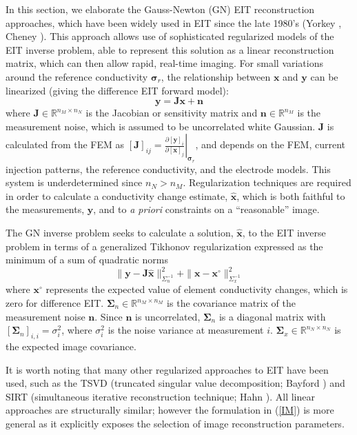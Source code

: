 \documentclass[12pt]{iopart}
\newcommand{\xB}{\mbox{$\mathbf{x}$}}
\newcommand{\xH}{\mbox{$\mathbf{\hat x}$}}
\newcommand{\nB}{\mbox{$\mathbf{n}$}}
\newcommand{\yB}{\mbox{$\mathbf{y}$}}
\newcommand{\JB}{\mbox{$\mathbf{J}$}}
\newcommand{\SG}{\mbox{${\boldsymbol \Sigma}$}}
\newcommand{\sG}{\mbox{${\boldsymbol \sigma}$}}
\begin{document}
In this section, we elaborate the
Gauss-Newton (GN) EIT reconstruction approaches,
which have been
widely used in EIT since the late 1980's (Yorkey ,
Cheney ).
This approach allows use of sophisticated regularized models
of the EIT inverse problem, able to represent this
solution as a linear reconstruction matrix, which can then allow
rapid, real-time imaging.
For small variations around the reference
conductivity $\sG_r$, the relationship between $\xB$ and $\yB$ can
be linearized (giving the difference EIT forward model):
\begin{equation}\label{FM}
\yB=\JB\xB+\nB
\end{equation}
where
$\JB\in\mathbb{R}^{n_M\times n_N}$ is the Jacobian or sensitivity
matrix and $\nB\in\mathbb{R}^{n_M}$ is the measurement noise, which is
assumed to be uncorrelated white Gaussian. $\JB$ is calculated from
the FEM as
$[\JB]_{ij}=\left.
     \frac{\partial[\yB]_i}{\partial[\xB]_j}
          \right|_{\sG_r}$,
and depends on the FEM, current injection patterns, the reference
conductivity, and the electrode models. This system is
underdetermined since $n_N > n_M$. 
Regularization techniques are required
in order to calculate a conductivity change
estimate, $\xH$, which is both
faithful to the measurements, $\yB$, and to
{\em a priori} constraints on a ``reasonable'' image.

The GN inverse problem seeks to
calculate a solution, $\xH$, to the EIT inverse problem
in terms of a generalized Tikhonov regularization 
expressed as the minimum of a sum of quadratic norms
\begin{equation}\label{IM}
 \|\yB-\JB\xH\|_{\Sigma_n^{-1}}^2 +
 \|\xB-\xB^\circ\|_{\Sigma_x^{-1}}^2
\end{equation}
where $\xB^\circ$ represents the expected value of element
conductivity changes, which is zero for  difference EIT.
$\SG_n\in\mathbb{R}^{n_M\times n_M}$ is
 the covariance matrix of the measurement noise $\nB$. Since
$\nB$ is uncorrelated, $\SG_n$ is a diagonal matrix with
$[\SG_n]_{i,i}=\sigma_i^2$, where $\sigma_i^2$ is the noise variance at
measurement $i$. $\SG_x\in\mathbb{R}^{n_N\times
n_N}$ is the expected image covariance.

It is worth noting that many other regularized approaches
to EIT have been used, such as the
TSVD (truncated singular value decomposition; Bayford )
and
SIRT (simultaneous iterative reconstruction technique; Hahn ).
All linear approaches are structurally similar; however
the formulation in (\ref{IM}) is more general
as it explicitly exposes the selection of image reconstruction
parameters.
\end{document}
